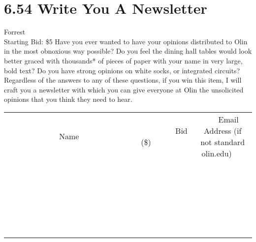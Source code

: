\documentclass[11pt]{article}
\begin{document}
\section*{6.54 Write You A Newsletter}
Forrest
\\
Starting Bid: \$5
\newline
Have you ever wanted to have your opinions distributed to Olin in the most obnoxious way possible? Do you feel the dining hall tables would look better graced with thousands* of pieces of paper with your name in very large, bold text? Do you have strong opinions on white socks, or integrated circuits? Regardless of the answers to any of these questions, if you win this item, I will craft you a newsletter with which you can give everyone at Olin the unsolicited opinions that you think they need to hear.
\\[6ex]
\begin{tabular}{c c c}
~~~~~~~~~~~~~Name~~~~~~~~~~~~~ & ~~~~~~~~~Bid (\$)~~~~~~~~~  & ~~~Email Address (if not standard olin.edu)~~~\\
 & & \\
\hline
 & & \\
\hline
 & & \\
\hline
 & & \\
\hline
 & & \\
\hline
 & & \\
\hline
 & & \\
\hline
 & & \\
\hline
 & & \\
\hline
 & & \\
\hline
 & & \\
\hline
 & & \\
\hline
 & & \\
\hline
 & & \\
\hline
 & & \\
\hline
 & & \\
\hline
 & & \\
\hline
 & & \\
\hline
 & & \\
\hline
 & & \\
\hline
 & & \\
\hline
 & & \\
\hline
 & & \\
\hline
 & & \\
\hline
 & & \\
\hline
 & & \\
\hline
\end{tabular}
\newpage
\end{document}
